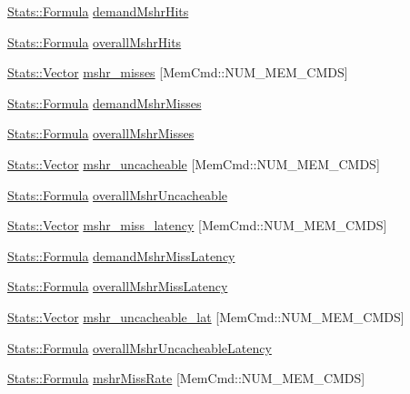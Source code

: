 \begin{DoxyCompactItemize}
\item 
\hyperlink{classStats_1_1Formula}{Stats::Formula} \hyperlink{group__CacheStatistics_gaf118fca77a3f5d6f217fcee58c71fec2}{demandMshrHits}
\item 
\hyperlink{classStats_1_1Formula}{Stats::Formula} \hyperlink{group__CacheStatistics_ga0fb9f1f22aa968d550eef9c03997ac18}{overallMshrHits}
\item 
\hyperlink{classStats_1_1Vector}{Stats::Vector} \hyperlink{group__CacheStatistics_gaececf7d3c236db3a8f26999e5330a7f8}{mshr\_\-misses} \mbox{[}MemCmd::NUM\_\-MEM\_\-CMDS\mbox{]}
\item 
\hyperlink{classStats_1_1Formula}{Stats::Formula} \hyperlink{group__CacheStatistics_ga378613cfcd9d1eb93a478cdfd5cfe47f}{demandMshrMisses}
\item 
\hyperlink{classStats_1_1Formula}{Stats::Formula} \hyperlink{group__CacheStatistics_ga89bdc1747e7c539c145e1721f92e9077}{overallMshrMisses}
\item 
\hyperlink{classStats_1_1Vector}{Stats::Vector} \hyperlink{group__CacheStatistics_gafef11db68765de904faaf296082e02e3}{mshr\_\-uncacheable} \mbox{[}MemCmd::NUM\_\-MEM\_\-CMDS\mbox{]}
\item 
\hyperlink{classStats_1_1Formula}{Stats::Formula} \hyperlink{group__CacheStatistics_gac79654a6d31745d642afc7a53b5ea638}{overallMshrUncacheable}
\item 
\hyperlink{classStats_1_1Vector}{Stats::Vector} \hyperlink{group__CacheStatistics_gacfad5551221a8363918fd4b484112695}{mshr\_\-miss\_\-latency} \mbox{[}MemCmd::NUM\_\-MEM\_\-CMDS\mbox{]}
\item 
\hyperlink{classStats_1_1Formula}{Stats::Formula} \hyperlink{group__CacheStatistics_ga9bba866a0a6f9d08968ea7793e1718d3}{demandMshrMissLatency}
\item 
\hyperlink{classStats_1_1Formula}{Stats::Formula} \hyperlink{group__CacheStatistics_ga54ac605e36884492867f19da4de6b8d3}{overallMshrMissLatency}
\item 
\hyperlink{classStats_1_1Vector}{Stats::Vector} \hyperlink{group__CacheStatistics_ga7dd6d70b9cba9493a783a2aceadb23b1}{mshr\_\-uncacheable\_\-lat} \mbox{[}MemCmd::NUM\_\-MEM\_\-CMDS\mbox{]}
\item 
\hyperlink{classStats_1_1Formula}{Stats::Formula} \hyperlink{group__CacheStatistics_ga860805a5426cb057583a0a1eb7dd9c4c}{overallMshrUncacheableLatency}
\item 
\hyperlink{classStats_1_1Formula}{Stats::Formula} \hyperlink{group__CacheStatistics_ga2e5641462c14394bea8a57328586ab08}{mshrMissRate} \mbox{[}MemCmd::NUM\_\-MEM\_\-CMDS\mbox{]}

\end{DoxyCompactItemize}
